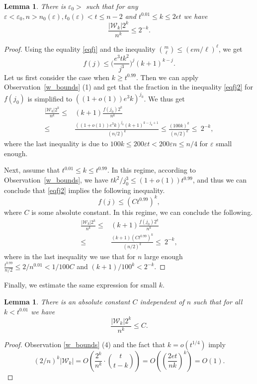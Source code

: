 \documentclass[11pt,letterpaper]{amsart}
\newcommand{\eps}{\varepsilon}
\renewcommand{\le}{\leqslant}
\renewcommand{\ge}{\geqslant}
\newcommand{\W}{\mathcal{W}}
\newtheorem{lemma}[theorem]{Lemma}
\begin{document}
\begin{lemma}\label{peelbound}
  There is $\eps_0 > $ such that for any $\eps < \eps_0, n > n_0(\eps), t_0(\eps) < t \le n-2$ and $t^{0.01}\le k\le 2\epsilon t$ we have
  \begin{equation}\label{eqobs7}\frac{|\W_k|2^k}{n^k}\le 2^{-k}.\end{equation}
\end{lemma}
\begin{proof}
  Using the equality \eqref{eqfj} and the inequality ${m\choose \ell}\le (em/\ell)^\ell$, we get
  \begin{equation}\label{eqfj2} f(j)\le \Big(\frac{e^3tk^2}{j^3}\Big)^j(k+1)^{k-j}.\end{equation}
Let us first consider the case when $k\ge t^{0.99}$. Then we can apply Observation~\ref{w_bounds} (1) and get that the fraction in the inequality \eqref{eqfj2} for $f(j_0)$ is simplified to $((1+o(1))e^3k)^{j_0}$. We thus get
\begin{align*}  \frac{|\W_k|2^k}{n^k}\le& (k+1) \frac{f(j_0)2^k}{n^k} \\
\le&  \frac{((1+o(1))e^3k)^{j_0}(k+1)^{k-j_0+1}}{(n/2)^k}
\le  \frac{(100k)^k}{(n/2)^k} \le \ 2^{-k},\end{align*}
where the last inequality is due to $100k \le 200\eps t < 200\eps n \le n/4$ for $\eps$ small enough.

  Next, assume that $t^{0.01}\le k\le t^{0.99}$. In this regime, according to Observation~\ref{w_bounds}, we have $tk^2/j_0^3\le (1+o(1))t^{0.99}$, and thus we can conclude that \eqref{eqfj2} implies the following inequality.
  $$f(j)\le (Ct^{0.99})^k,$$
  where $C$ is some absolute constant. In this regime, we can conclude the following.
  \begin{align*}  \frac{|\W_k|2^k}{n^k}\le& (k+1) \frac{f(j_0)2^k}{n^k} \\
\le&    \frac{(k+1)(Ct^{0.99})^k}{(n/2)^k} \le \ 2^{-k},\end{align*}
where in the last inequality we use that for $n$ large enough $\frac{t^{0.99}}{n/2}\le 2/n^{0.01} < 1/100C$ and $(k+1)/100^k < 2^{-k}$.
\end{proof}

Finally, we estimate the same expression for small $k$.

\begin{lemma}\label{peelbound_small}
There is an absolute constant $C$ independent of $n$ such that for all $k < t^{0.01}$ we have $$\frac{|\W_k|2^k}{n^k}\le C.$$
\end{lemma}
\begin{proof}
    Observation \ref{w_bounds} (4) and the fact that $k = o(t^{1/4})$ imply $$(2/n)^k|\W_k| = O\left(\frac{2^k}{n^k}\cdot {t \choose t-k}\right) = O\left(\left(\frac{2et}{nk}\right)^k\right) = O(1).$$
\end{proof}
\end{document}
